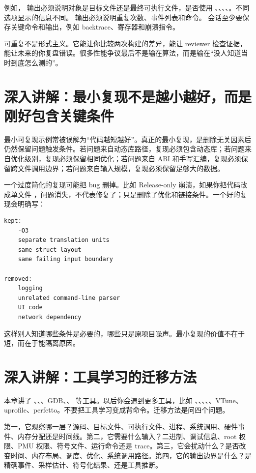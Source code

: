 例如， 输出必须说明对象是目标文件还是最终可执行文件，是否使用 、、、、。不同选项显示的信息不同。  输出必须说明重复次数、事件列表和命令。  会话至少要保存关键命令和输出，例如 backtrace、寄存器和崩溃指令。

可重复不是形式主义。它能让你比较两次构建的差异，能让 reviewer 检查证据，能让未来的你复盘错误。很多性能争议最后不是输在算法，而是输在“没人知道当时到底怎么测的”。

\section{深入讲解：最小复现不是越小越好，而是刚好包含关键条件}

最小可复现示例常被误解为“代码越短越好”。真正的最小复现，是删除无关因素后仍然保留问题触发条件。若问题来自动态库路径，复现必须包含动态库；若问题来自优化级别，复现必须保留相同优化；若问题来自 ABI 和手写汇编，复现必须保留跨文件调用边界；若问题来自输入规模，复现必须保留足够大的数据。

一个过度简化的复现可能把 bug 删掉。比如 Release-only 崩溃，如果你把代码改成单文件 ，问题消失，不代表修复了；只是删除了优化和链接条件。一个好的复现会明确写：

\begin{lstlisting}
kept:
    -O3
    separate translation units
    same struct layout
    same failing input boundary

removed:
    logging
    unrelated command-line parser
    UI code
    network dependency
\end{lstlisting}

这样别人知道哪些条件是必要的，哪些只是原项目噪声。最小复现的价值不在于短，而在于能隔离原因。

\section{深入讲解：工具学习的迁移方法}

本章讲了 、、、GDB、、 等工具。以后你会遇到更多工具，比如 、、、、、VTune、uprofile、perfetto。不要把工具学习变成背命令。迁移方法是问四个问题。

第一，它观察哪一层？源码、目标文件、可执行文件、进程、系统调用、硬件事件、内存分配还是时间线。第二，它需要什么输入？二进制、调试信息、root 权限、PMU 权限、符号文件、运行命令还是 trace。第三，它会扰动什么？是否改变时间、内存布局、调度、优化、系统调用路径。第四，它的输出边界是什么？是精确事件、采样估计、符号化结果、还是工具推断。

